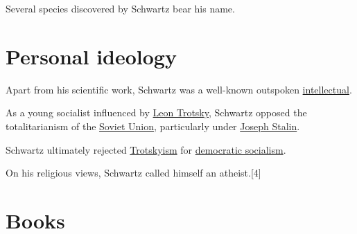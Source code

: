 \documentclass{book}
\numberwithin{equation}{section}
\begin{document}
Several species discovered by Schwartz bear his name.

\section{Personal ideology}
Apart from his scientific work, Schwartz was a well-known outspoken \href{https://en.wikipedia.org/wiki/Intellectual}{intellectual}.

As a young socialist influenced by \href{https://en.wikipedia.org/wiki/Leon_Trotsky}{Leon Trotsky}, Schwartz opposed the \href{https://en.wikipedia.org/wiki/Totalitarianism}{}{totalitarianism} of the \href{https://en.wikipedia.org/wiki/Soviet_Union}{Soviet Union}, particularly under \href{https://en.wikipedia.org/wiki/Joseph_Stalin}{Joseph Stalin}.

Schwartz ultimately rejected \href{https://en.wikipedia.org/wiki/Trotskyism}{Trotskyism} for \href{https://en.wikipedia.org/wiki/Democratic_socialism}{democratic socialism}.

%
On his religious views, Schwartz called himself an atheist.[4]

\section{Books}
\end{document}
